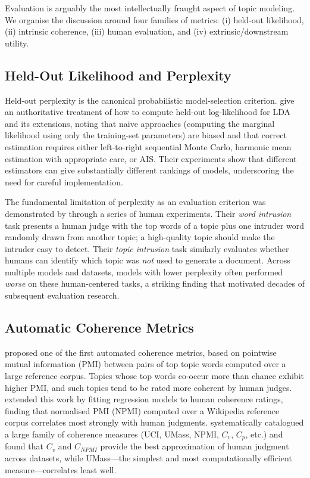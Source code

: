 \documentclass[11pt,a4paper]{article}
\begin{document}
Evaluation is arguably the most intellectually fraught aspect of topic
modeling.
We organise the discussion around four families of metrics: (i)
held-out likelihood, (ii) intrinsic coherence, (iii) human evaluation,
and (iv) extrinsic/downstream utility.

\subsection{Held-Out Likelihood and Perplexity}
\label{sec:eval-perplexity}

Held-out perplexity is the canonical probabilistic model-selection
criterion.
\textcite{wallach2009evaluation} give an authoritative treatment of how
to compute held-out log-likelihood for LDA and its extensions, noting
that naive approaches (computing the marginal likelihood using only the
training-set parameters) are biased and that correct estimation requires
either left-to-right sequential Monte Carlo, harmonic mean estimation
with appropriate care, or AIS.
Their experiments show that different estimators can give substantially
different rankings of models, underscoring the need for careful
implementation.

The fundamental limitation of perplexity as an evaluation criterion was
demonstrated by \textcite{chang2009reading} through a series of human
experiments.
Their \emph{word intrusion} task presents a human judge with the top
words of a topic plus one intruder word randomly drawn from another
topic; a high-quality topic should make the intruder easy to detect.
Their \emph{topic intrusion} task similarly evaluates whether humans
can identify which topic was \emph{not} used to generate a document.
Across multiple models and datasets, models with lower perplexity often
performed \emph{worse} on these human-centered tasks, a striking finding
that motivated decades of subsequent evaluation research.

\subsection{Automatic Coherence Metrics}
\label{sec:eval-coherence}

\textcite{newman2010automatic} proposed one of the first automated
coherence metrics, based on pointwise mutual information (PMI) between
pairs of top topic words computed over a large reference corpus.
Topics whose top words co-occur more than chance exhibit higher PMI,
and such topics tend to be rated more coherent by human judges.
\textcite{lau2014machine} extended this work by fitting regression
models to human coherence ratings, finding that normalised PMI (NPMI)
computed over a Wikipedia reference corpus correlates most strongly
with human judgments.
\textcite{roder2015exploring} systematically catalogued a large family
of coherence measures (UCI, UMass, NPMI, $C_{v}$, $C_{p}$, etc.) and
found that $C_{v}$ and $C_{NPMI}$ provide the best approximation of
human judgment across datasets, while UMass---the simplest and most
computationally efficient measure---correlates least well.
\end{document}
